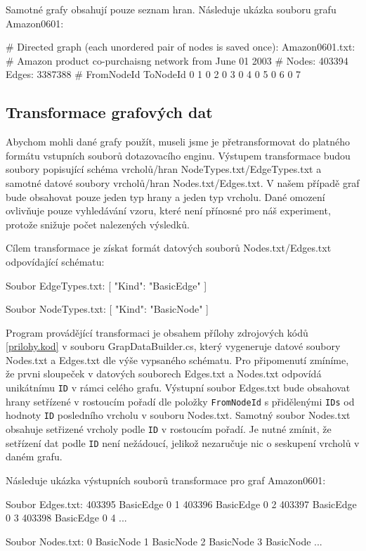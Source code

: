 Samotné grafy obsahují pouze seznam hran. Následuje ukázka souboru grafu Amazon0601:

\begin{code}
# Directed graph (each unordered pair of nodes is saved once): 
    Amazon0601.txt: 
# Amazon product co-purchaisng network from June 01 2003
# Nodes: 403394 Edges: 3387388
# FromNodeId	ToNodeId
0	1
0	2
0	3
0	4
0	5
0	6
0	7
\end{code}

\subsection{Transformace grafových dat}

Abychom mohli dané grafy použít, museli jsme je přetransformovat do platného formátu vstupních souborů dotazovacího enginu. Výstupem transformace budou soubory popisující schéma vrcholů/hran NodeTypes.txt/EdgeTypes.txt a samotné datové soubory vrcholů/hran Nodes.txt/Edges.txt.
V našem případě graf bude obsahovat pouze jeden typ hrany a jeden typ vrcholu. Dané omození ovlivňuje pouze vyhledávání vzoru, které není přínosné pro náš experiment, protože snižuje počet nalezených výsledků. 

Cílem transformace je získat formát datových souborů Nodes.txt/Edges.txt odpovídající schématu:
\begin{code}
Soubor EdgeTypes.txt:
[
{
"Kind": "BasicEdge"
}
]

Soubor NodeTypes.txt:
[
{
"Kind": "BasicNode"
}
]

\end{code}

Program provádějící transformaci je obsahem přílohy zdrojových kódů \ref{prilohy.kod} v souboru GrapDataBuilder.cs, který vygeneruje datové soubory Nodes.txt a Edges.txt dle výše vypsaného schématu.
Pro připomenutí zmíníme, že prvni sloupeček v datových souborech Edges.txt a Nodes.txt odpovídá unikátnímu \verb+ID+ v rámci celého grafu.
Výstupní soubor Edges.txt bude obsahovat hrany setřízené v rostoucím pořadí dle položky \verb+FromNodeId+ s přidělenými \verb+IDs+ od hodnoty \verb+ID+ posledního vrcholu v souboru Nodes.txt.
Samotný soubor Nodes.txt obsahuje setřizené vrcholy podle \verb+ID+ v rostoucím pořadí. Je nutné zmínit, že setřízení dat podle \verb+ID+ není nežádoucí, jelikož nezaručuje nic o seskupení vrcholů v daném grafu.

Následuje ukázka výstupních souborů transformace pro graf Amazon0601:  
\begin{code}
Soubor Edges.txt:
403395 BasicEdge 0 1
403396 BasicEdge 0 2
403397 BasicEdge 0 3
403398 BasicEdge 0 4
...

Soubor Nodes.txt:
0 BasicNode 
1 BasicNode 
2 BasicNode 
3 BasicNode
...
\end{code}

